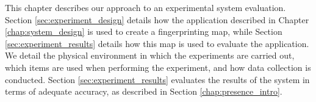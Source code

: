 This chapter describes our approach to an experimental system evaluation.
Section \ref{sec:experiment_design} details how the application described in Chapter \ref{chap:system_design} is used to create a fingerprinting map, while Section \ref{sec:experiment_results} details how this map is used to evaluate the application.
We detail the physical environment in which the experiments are carried out, which items are used when performing the experiment, and how data collection is conducted.
Section \ref{sec:experiment_results} evaluates the results of the system in terms of adequate accuracy, as described in Section \ref{chap:presence_intro}. 
